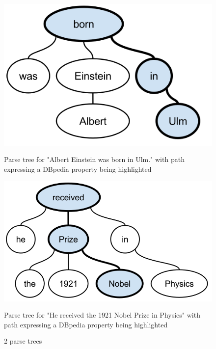 \begin{figure}[htb]
\begin{minipage}{.5\textwidth}
  \centering
  \includegraphics[width=\textwidth]{src/img/parse-tree2.png}
  \caption[Parse tree with path expressing a property, Example 1]{Parse tree for "Albert Einstein was born in Ulm." with path expressing a DBpedia property being highlighted}
  \label{fig:parse-tree1}
\end{minipage}
\begin{minipage}{.5\textwidth}
  \centering
  \captionsetup{justification=centering}
  \centering
  \includegraphics[width=\textwidth]{src/img/parse-tree1.png}
  \caption[Parse tree with path expressing a property, Example 2]{Parse tree for "He received the 1921 Nobel Prize in Physics" with path expressing a DBpedia property being highlighted}
  \label{fig:parse-tree2}
\end{minipage}%
  \caption[]{2 parse trees}
  \label{fig:parse-trees}
\end{figure}


